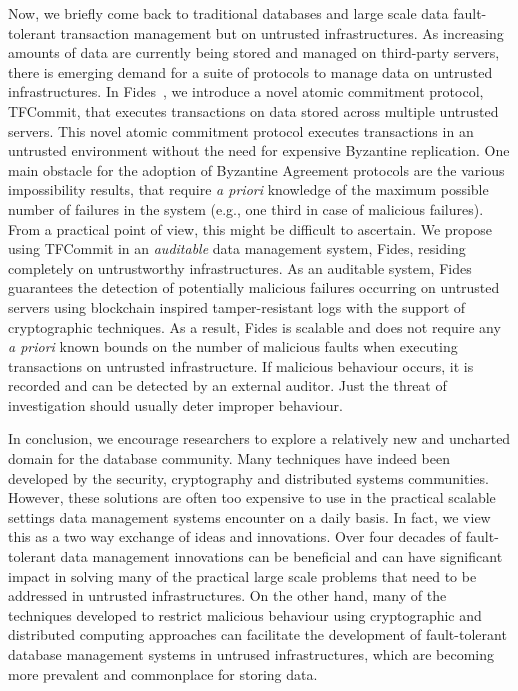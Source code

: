 \documentclass[11pt]{article}
\begin{document}
Now, we briefly come back to traditional databases and large scale data fault-tolerant transaction management but on untrusted infrastructures.  As increasing amounts of data are currently being stored and managed on third-party servers, there is emerging demand for a suite of protocols to manage data on untrusted infrastructures. In Fides~\cite{maiyya2020fides}, we introduce a novel atomic commitment protocol, TFCommit, that executes transactions on data stored across multiple untrusted servers. This novel atomic commitment protocol executes transactions in an untrusted environment without the need for expensive Byzantine replication. One main obstacle for the adoption of Byzantine Agreement protocols are the various impossibility results, that require {\em a priori} knowledge of the maximum possible number of failures in the system (e.g., one third in case of malicious failures).  From a practical point of view, this might be difficult to ascertain.  We propose using TFCommit in an {\em auditable} data management system, Fides, residing completely on untrustworthy infrastructures. As an auditable system, Fides guarantees the detection of potentially malicious failures occurring on untrusted servers using blockchain inspired tamper-resistant logs with the support of cryptographic techniques. As a result, Fides is scalable and does not require any {\em a priori} known bounds on the number of malicious faults when executing transactions on untrusted infrastructure.  If malicious behaviour occurs, it is recorded and can be detected by an external auditor.  Just the threat of investigation should usually deter improper behaviour.

In conclusion, we encourage researchers to explore a relatively new and uncharted domain for the database community.  Many techniques have indeed been developed by the security, cryptography and distributed systems communities.  However, these solutions are often too expensive to use in the practical scalable settings data management systems encounter on a daily basis. 
In fact, we view this as a two way exchange of ideas and innovations.  Over four decades of fault-tolerant data management innovations can be beneficial and can have significant impact in solving many of the practical large scale problems that need to be addressed in untrusted infrastructures.   On the other hand, many of the techniques developed to restrict malicious behaviour using cryptographic and distributed computing approaches can facilitate the development of fault-tolerant database management systems in untrused infrastructures, which are becoming more prevalent and commonplace for storing data.
\end{document}
